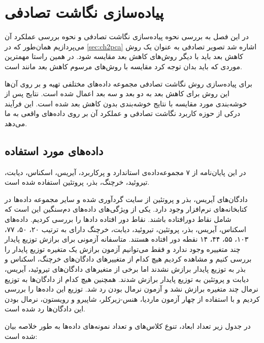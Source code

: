 \chapter{
پیاده‌سازی نگاشت تصادفی
}

در این فصل به بررسی نحوه پیاده‌سازی نگاشت تصادفی و نحوه بررسی عملکرد آن می‌پردازیم همان‌طور که در  
\autoref{sec:ch2pca}
اشاره شد تصویر تصادفی به عنوان یک روش کاهش بعد باید با دیگر روش‌های کاهش بعد مقایسه شود. در همین راستا مهمترین موردی که باید بدان توجه کرد مقایسه با روش‌های مرسوم کاهش بعد مانند
است.

برای پیاده‌سازی روش نگاشت تصادفی مجموعه داده‌های مختلفی تهیه‌ و بر روی آن‌ها این روش برای کاهش بعد به دو بعد و سه بعد اعمال شده است. نتایج پس از خوشه‌بندی مورد مقایسه با نتایج خوشه‌بندی بدون کاهش بعد شده است. این فرآیند درکی از حوزه کاربرد نگاشت تصادفی و عملکرد آن بر روی داده‌های واقعی به ما می‌دهد.


\section{
داده‌های مورد استفاده
}

در این پایان‌نامه از ۷ مجموعه‌داده‌ی استاندارد و پرکاربرد، آیریس، اسکناس، دیابت، تیروئید، خرچنگ، بذر، پروتئین استفاده شده است.

دادگا‌ن‌های آیریس، بذر و پروتئین از سایت 
گردآوری شده و سایر مجموعه داده‌ها در کتابخانه‌های نرم‌افزار 
وجود دارد. یکی از ویژگی‌های داده‌های دم‌سنگین این است که شامل نقاط دورافتاده باشند. نقاط دور افتاده داد‌ها را بررسی کردیم. داده‌های اسکناس، آیریس، بذر، پروتئین، تیروئید، دیابت، خرچنگ دارای به ترتیب ۲۰، ۵۰، ۷۷، ۱۰۳، ۵۵، ۴۴، ۱۴ نقطه دور افتاده هستند. متاسفانه آزمونی برای برازش توزیع پایدار چند متغییره وجود ندارد و فقط می‌توانیم آزمون برازش یک متغیره توزیع پایدار را بررسی کنیم و مشاهده کردیم هیچ کدام از متغییر‌های دادگان‌های خرچنگ، اسکناس و بذر به توزیع پایدار برازش نشدند اما برخی از متغیرهای دادگان‌های تیروئید، آیریس، دیابت و پروتئین به توزیع پایدار برازش شدند. همچنین هیچ کدام از دادگان‌ها به توزیع نرمال چند متغیره برازش نشد و آزمون نرمال بودن رد شد. توزیع این داده‌ها را بررسی کردیم و با استفاده از چهار آزمون ماردیا، هنس-زیرکلر، شاپیرو و رویستون، نرمال بودن این دادگان‌ها رد شده است.%
\cite{spisheh2018}

در جدول زیر تعداد ابعاد، تنوع کلاس‌های و تعداد نمونه‌های داده‌ها به طور خلاصه بیان شده است:

